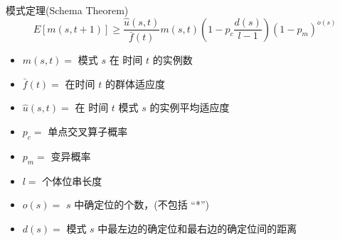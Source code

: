 \documentclass[presentation]{beamer}
\begin{document}
\begin{frame}[label={sec:org6be0cf7}]{模式定理(Schema Theorem)}
\[E[m(s,t+1)] \geq \frac{\hat{u}(s,t)}{\bar{f}(t)}m(s,t) \left(1 -
p_{c}\frac{d(s)}{l-1}\right) (1 - p_{m})^{o(s)} \]

\begin{itemize}
\item \(m(s,t) =\)  模式 \(s\) 在 时间 \(t\) 的实例数
\item \(\bar{f}(t) =\) 在时间 \(t\) 的群体适应度
\item \(\hat{u}(s,t) =\)  在 时间 \(t\) 模式 \(s\) 的实例平均适应度
\item \(p_c =\) 单点交叉算子概率
\item \(p_m =\) 变异概率
\item \(l =\) 个体位串长度
\item \(o(s)=\)  \(s\) 中确定位的个数，(不包括 ``*'')
\item \(d(s) =\)  模式 \(s\) 中最左边的确定位和最右边的确定位间的距离
\end{itemize}
\end{frame}
\end{document}

